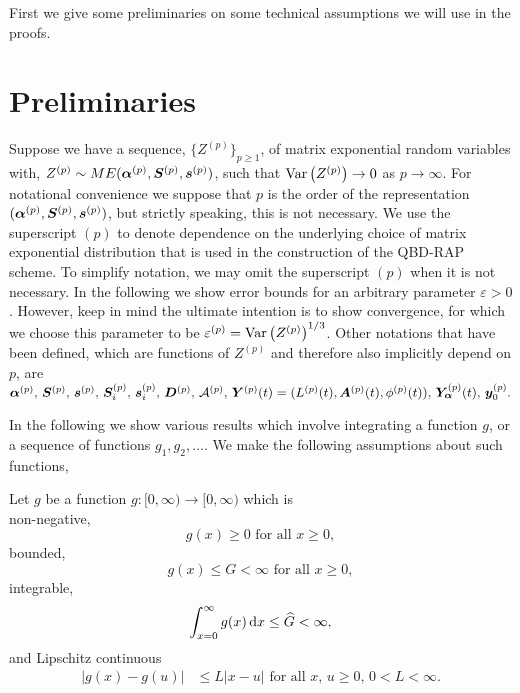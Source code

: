First we give some preliminaries on some technical assumptions we will use in the proofs. 

\section*{Preliminaries}
Suppose we have a sequence, \(\{Z^{(p)}\}_{p\geq 1}\), of matrix exponential random variables with, \(Z^{(p)}\sim ME(\boldsymbol\alpha^{(p)},\boldsymbol S^{(p)}, \boldsymbol s^{(p)})\), such that \(\mathrm{Var}\left(Z^{(p)}\right)\to 0 \) as \(p\to \infty\). For notational convenience we suppose that \(p\) is the order of the representation \((\boldsymbol\alpha^{(p)},\boldsymbol S^{(p)}, \boldsymbol s^{(p)})\), but strictly speaking, this is not necessary. We use the superscript \((p)\) to denote dependence on the underlying choice of matrix exponential distribution that is used in the construction of the QBD-RAP scheme. To simplify notation, we may omit the superscript \((p)\) when it is not necessary. In the following we show error bounds for an arbitrary parameter \(\varepsilon>0\). However, keep in mind the ultimate intention is to show convergence, for which we choose this parameter to be \(\varepsilon^{(p)}=\mathrm{Var}\left(Z^{(p)}\right)^{1/3}\). Other notations that have been defined, which are functions of \(Z^{(p)}\) and therefore also implicitly depend on \(p\), are \(\boldsymbol\alpha^{(p)},\,\boldsymbol S^{(p)},\,\boldsymbol s^{(p)},\, \boldsymbol S_i^{(p)},\, \boldsymbol s_i^{(p)},\, \boldsymbol D^{(p)},\,\mathcal A^{(p)},\, \boldsymbol Y^{(p)}(t) = (L^{(p)}(t),\boldsymbol A^{(p)}(t), \phi^{(p)}(t)),\, \bm{Y}_{\bm{\alpha}}^{(p)}(t),\, \boldsymbol y_0^{(p)}.\)

In the following we show various results which involve integrating a function \(g\), or a sequence of functions \(g_1,g_2,\dots\). We make the following assumptions about such functions, 
\begin{asu}\label{asu: g}
	Let \(g\) be a function \(g:[0,\infty)\to [0,\infty)\) which is \\
	\subasu \label{asu: g non-neg} non-negative, 
	\[g(x) \geq 0 \mbox{ for all } x \geq 0,\]
	\subasu bounded, 
	\[g(x) \leq G < \infty \mbox{ for all } x \geq 0,\]
	\subasu integrable, 
	\[\int_{x=0}^\infty g(x)\, \mathrm{d} x \leq \widehat G < \infty,\]
	\subasu \label{asu: lipschitz} and Lipschitz continuous 
	\begin{align}
		|g(x) - g(u)|&\leq L|x - u| \mbox{ for all } x,\, u \geq 0,\, 0<L<\infty.
	\end{align}
\end{asu}

